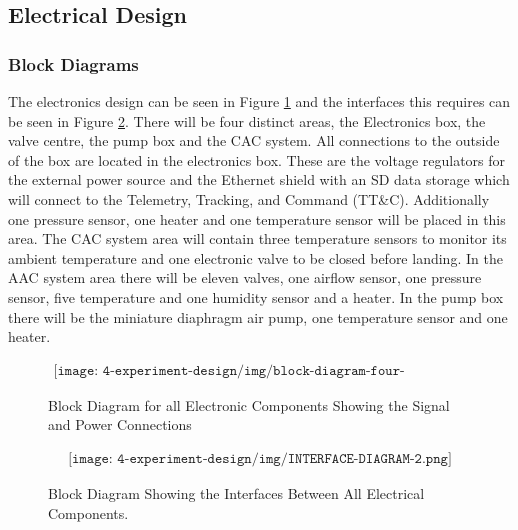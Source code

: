 \pagebreak
\subsection{Electrical Design}

\subsubsection{Block Diagrams}
\begin{centering}
The electronics design can be seen in Figure \ref{fig:electronics-block-diagram} and the interfaces this requires can be seen in Figure \ref{fig:eee-interface-diagram}. There will be four distinct areas, the Electronics box, the valve centre, the pump box and the CAC system. All connections to the outside of the box are located in the electronics box. These are the voltage regulators for the external power source and the Ethernet shield with an SD data storage which will connect to the Telemetry, Tracking, and Command (TT\&C). Additionally one pressure sensor, one heater and one temperature sensor will be placed in this area. The CAC system area will contain three temperature sensors to monitor its ambient temperature and one electronic valve to be closed before landing. In the AAC system area there will be eleven valves, one airflow sensor, one pressure sensor, five temperature and one humidity sensor and a heater. In the pump box there will be the miniature diaphragm air pump, one temperature sensor and one heater.
\end{centering}
\bigskip

\begin{figure}[H]
    \begin{align*}
        \texttt{[image: 4-experiment-design/img/block-diagram-four-sections.png]}
    \end{align*}
    \caption{Block Diagram for all Electronic Components Showing the Signal and Power Connections}\label{fig:electronics-block-diagram}
\end{figure}


\begin{figure}[H]
    \begin{align*}
        \texttt{[image: 4-experiment-design/img/INTERFACE-DIAGRAM-2.png]}
    \end{align*}
    \caption{Block Diagram Showing the Interfaces Between All Electrical Components.}\label{fig:eee-interface-diagram}
\end{figure}

